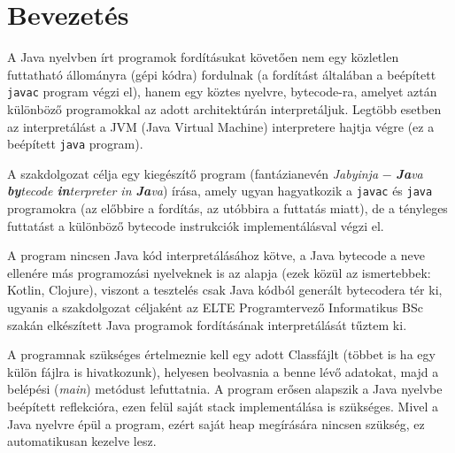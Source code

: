 \chapter{Bevezetés}
\label{ch:intro}

A Java nyelvben írt programok fordításukat követően nem egy közletlen futtatható állományra (gépi kódra) fordulnak (a fordítást általában a beépített \lstinline{javac} program végzi el), hanem egy köztes nyelvre, bytecode-ra, amelyet aztán különböző programokkal az adott architektúrán interpretáljuk. Legtöbb esetben az interpretálást a JVM (Java Virtual Machine) interpretere hajtja végre (ez a beépített \lstinline{java} program).

A szakdolgozat célja egy kiegészítő program (fantázianevén \textit{Jabyinja} $-$ \textit{\textbf{Ja}va \textbf{by}tecode \textbf{in}terpreter in \textbf{Ja}va}) írása, amely ugyan hagyatkozik a \lstinline{javac} és \lstinline{java} programokra (az előbbire a fordítás, az utóbbira a futtatás miatt), de a tényleges futtatást a különböző bytecode instrukciók implementálásval végzi el.

A program nincsen Java kód interpretálásához kötve, a Java bytecode a neve ellenére más programozási nyelveknek is az alapja (ezek közül az ismertebbek: Kotlin, Clojure), viszont a tesztelés csak Java kódból generált bytecodera tér ki, ugyanis a szakdolgozat céljaként az ELTE Programtervező Informatikus BSc szakán elkészített Java programok fordításának interpretálását tűztem ki.

A programnak szükséges értelmeznie kell egy adott Classfájlt (többet is ha egy külön fájlra is hivatkozunk), helyesen beolvasnia a benne lévő adatokat, majd a belépési (\textit{main}) metódust lefuttatnia. A program erősen alapszik a Java nyelvbe beépített reflekcióra, ezen felül saját stack implementálása is szükséges. Mivel a Java nyelvre épül a program, ezért saját heap megírására nincsen szükség, ez automatikusan kezelve lesz.